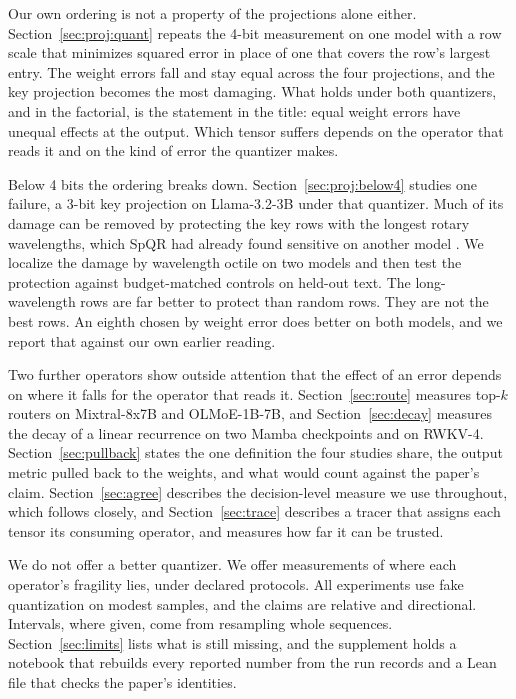 \documentclass[10pt]{article}
\begin{document}
Our own ordering is not a property of the projections alone either.
Section~\ref{sec:proj:quant} repeats the 4-bit measurement on one model with a row scale that
minimizes squared error in place of one that covers the row's largest entry. The weight errors
fall and stay equal across the four projections, and the key projection becomes the most
damaging. What holds under both quantizers, and in the factorial, is the statement in the title:
equal weight errors have unequal effects at the output. Which tensor suffers depends on the
operator that reads it and on the kind of error the quantizer makes.

Below 4 bits the ordering breaks down. Section~\ref{sec:proj:below4} studies one failure, a
3-bit key projection on Llama-3.2-3B under that quantizer. Much of its damage can be removed by
protecting the key rows with the longest rotary wavelengths,
which SpQR had already found sensitive on another model \citep{dettmers2024spqr}. We localize
the damage by wavelength octile on two models and then test the protection against
budget-matched controls on held-out text. The long-wavelength rows are far better to protect
than random rows. They are not the best rows. An eighth chosen by weight error does better on
both models, and we report that against our own earlier reading.

Two further operators show outside attention that the effect of an error depends on where
it falls for the operator that reads it. Section~\ref{sec:route} measures
top-$k$ routers on Mixtral-8x7B and OLMoE-1B-7B, and Section~\ref{sec:decay} measures the decay
of a linear recurrence on two Mamba checkpoints and on RWKV-4. Section~\ref{sec:pullback} states the one definition the four studies share, the output
metric pulled back to the weights, and what would count against the paper's claim.
Section~\ref{sec:agree} describes the decision-level
measure we use throughout, which follows \citet{dutta2024accuracy} closely, and
Section~\ref{sec:trace} describes a tracer that assigns each tensor its consuming operator,
and measures how far it can be trusted.

We do not offer a better quantizer. We offer measurements of where each operator's fragility
lies, under declared protocols. All experiments use fake quantization on modest samples, and the
claims are relative and directional. Intervals, where given, come from resampling whole
sequences. Section~\ref{sec:limits} lists what is still missing, and the supplement holds a
notebook that rebuilds every reported number from the run records and a Lean file that checks
the paper's identities.
\end{document}
